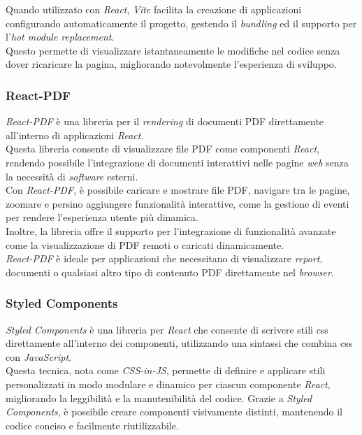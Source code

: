 \noindent Quando utilizzato con \textit{React}, \textit{Vite} facilita la creazione di applicazioni configurando automaticamente il progetto, gestendo il \textit{bundling} ed il supporto per l'\textit{hot module replacement}.\\
Questo permette di visualizzare istantaneamente le modifiche nel codice senza dover ricaricare la pagina, migliorando notevolmente l’esperienza di sviluppo.

\subsubsection{React-PDF}

\textit{React-PDF} è una libreria per il \textit{rendering} di documenti PDF direttamente all'interno di applicazioni \textit{React}. \\
Questa libreria consente di visualizzare file PDF come componenti \textit{React}, rendendo possibile l'integrazione di documenti interattivi nelle pagine \textit{web} senza la necessità di \textit{software} esterni.\\

\noindent Con \textit{React-PDF}, è possibile caricare e mostrare file PDF, navigare tra le pagine, zoomare e persino aggiungere funzionalità interattive, come la gestione di eventi per rendere l’esperienza utente più dinamica. \\
Inoltre, la libreria offre il supporto per l’integrazione di funzionalità avanzate come la visualizzazione di PDF remoti o caricati dinamicamente.\\
\textit{React-PDF} è ideale per applicazioni che necessitano di visualizzare \textit{report}, documenti o qualsiasi altro tipo di contenuto PDF direttamente nel \textit{browser}.

\subsubsection{Styled Components}

\textit{Styled Components} è una libreria per \textit{React} che consente di scrivere stili \gls{css} direttamente all’interno dei componenti, utilizzando una sintassi che combina \gls{css} con \textit{JavaScript}.\\
Questa tecnica, nota come \textit{CSS-in-JS}, permette di definire e applicare stili personalizzati in modo modulare e dinamico per ciascun componente \textit{React}, migliorando la leggibilità e la manutenibilità del codice. 
Grazie a \textit{Styled Components}, è possibile creare componenti visivamente distinti, mantenendo il codice conciso e facilmente riutilizzabile.\\

